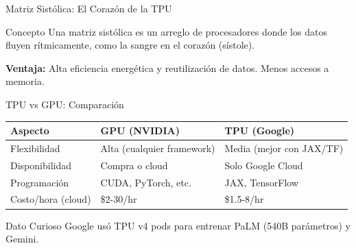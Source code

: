 \documentclass[aspectratio=169]{beamer}
\begin{document}
\begin{frame}{Matriz Sistólica: El Corazón de la TPU}
    \begin{block}{Concepto}
        Una matriz sistólica es un arreglo de procesadores donde los datos fluyen rítmicamente, como la sangre en el corazón (sístole).
    \end{block}
    
    \centering
    
    \vspace{0.3cm}
    \textbf{Ventaja:} Alta eficiencia energética y reutilización de datos. Menos accesos a memoria.
\end{frame}

\begin{frame}{TPU vs GPU: Comparación}
    \begin{table}[]
        \centering
        \renewcommand{\arraystretch}{1.4}
        \begin{tabular}{p{4cm} p{4.5cm} p{4.5cm}}
            \toprule
            \textbf{Aspecto} & \textbf{GPU (NVIDIA)} & \textbf{TPU (Google)} \\
            \midrule
            Flexibilidad & Alta (cualquier framework) & Media (mejor con JAX/TF) \\
            Disponibilidad & Compra o cloud & Solo Google Cloud \\
            Programación & CUDA, PyTorch, etc. & JAX, TensorFlow \\
            Costo/hora (cloud) & \$2-30/hr & \$1.5-8/hr \\
            \bottomrule
        \end{tabular}
    \end{table}
    
    \vspace{0.3cm}
    \begin{exampleblock}{Dato Curioso}
        Google usó TPU v4 pods para entrenar PaLM (540B parámetros) y Gemini.
    \end{exampleblock}
\end{frame}
\end{document}
